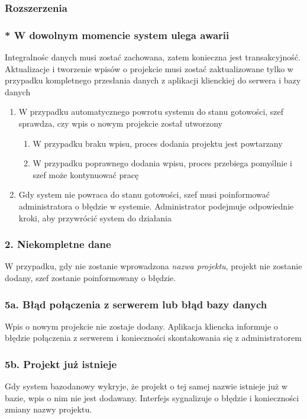 \documentclass{article}
\begin{document}
\subsubsection*{Rozszerzenia}

\subsubsection*{* W dowolnym momencie system ulega awarii}
Integralnośc danych musi zostać zachowana, zatem konieczna jest transakcyjność. Aktualizacje
i tworzenie wpisów o projekcie musi zostać zaktualizowane tylko w przypadku kompletnego przesłania
danych z aplikacji klienckiej do serwera i bazy danych
\begin{enumerate}
    \item W przypadku automatycznego powrotu systemu do stanu gotowości, szef sprawdza, czy wpis o nowym projekcie został utworzony
          \begin{enumerate}
              \item W przypadku braku wpisu, proces dodania projektu jest powtarzany
              \item W przypadku poprawnego dodania wpisu, proces przebiega pomyślnie i szef może kontynuować pracę
          \end{enumerate}
    \item Gdy system nie powraca do stanu gotowości, szef musi poinformować administratora o błędzie w systemie. Administrator podejmuje odpowiednie kroki, aby przywrócić system do działania
\end{enumerate}

\subsubsection*{2. Niekompletne dane}
W przypadku, gdy nie zostanie wprowadzona \textit{nazwa projektu}, projekt nie zostanie dodany, szef zostanie poinformowany o błędzie.

\subsubsection*{5a. Błąd połączenia z serwerem lub błąd bazy danych}
Wpis o nowym projekcie nie zostaje dodany. Aplikacja kliencka informuje o błędzie połączenia z serwerem i konieczności skontakowania się z administratorem

\subsubsection*{5b. Projekt już istnieje}
Gdy system bazodanowy wykryje, że projekt o tej samej nazwie istnieje już w bazie, wpis o nim nie jest dodawany. Interfejs sygnalizuje o błędzie i konieczności zmiany nazwy projektu.
\end{document}
